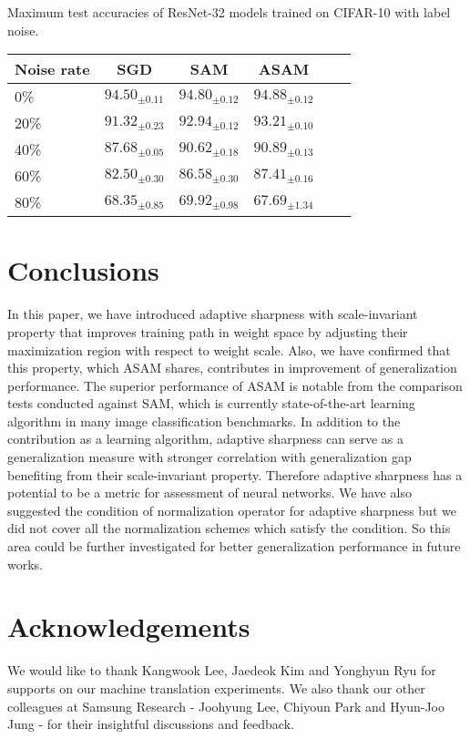 \documentclass{article}
\newcommand{\mf}[1]{\mathbf{#1}}
\begin{document}
\begintable
\caption{Maximum test accuracies of ResNet-32 models trained on CIFAR-10 with label noise.\label{noise32}}
\begin{center}
\begin{small}
\begin{tabular}{lccccr}
\toprule
Noise rate & SGD & SAM & ASAM \\
\midrule
0\% & $94.50_{\pm 0.11}$ & $94.80_{\pm 0.12}$ & $\mf{94.88}_{\pm 0.12}$ \\
20\% & $91.32_{\pm 0.23}$ & $92.94_{\pm 0.12}$ & $\mf{93.21}_{\pm 0.10}$ \\
40\% & $87.68_{\pm 0.05}$ & $90.62_{\pm 0.18}$ & $\mf{90.89}_{\pm 0.13}$ \\
60\% & $82.50_{\pm 0.30}$ & $86.58_{\pm 0.30}$ & $\mf{87.41}_{\pm 0.16}$ \\
80\% & $68.35_{\pm 0.85}$ & $\mf{69.92}_{\pm 0.98}$ & $67.69_{\pm 1.34}$ \\
\bottomrule
\end{tabular}
\end{small}
\end{center}
\jmkendtable

\ificml
\else
    \clearpage
\fi

\section{Conclusions}\label{sec:c}
In this paper, we have introduced adaptive sharpness with scale-invariant property that improves training path in weight space by adjusting their maximization region with respect to weight scale. Also, we have confirmed that this property, which ASAM shares, contributes in improvement of generalization performance. The superior performance of ASAM is notable from the comparison tests conducted against SAM, which is currently state-of-the-art learning algorithm in many image classification benchmarks. In addition to the contribution as a learning algorithm, adaptive sharpness can serve as a generalization measure with stronger correlation with generalization gap benefiting from their scale-invariant property. Therefore adaptive sharpness has a potential to be a metric for assessment of neural networks. We have also suggested the condition of normalization operator for adaptive sharpness but we did not cover all the normalization schemes which satisfy the condition. So this area could be further investigated for better generalization performance in future works. 

\section{Acknowledgements}
We would like to thank Kangwook Lee, Jaedeok Kim and Yonghyun Ryu for supports on our machine translation experiments. We also thank our other colleagues at Samsung Research - Joohyung Lee, Chiyoun Park and Hyun-Joo Jung - for their insightful discussions and feedback.
\end{document}
